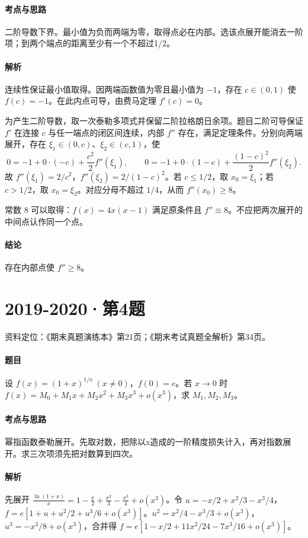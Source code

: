 \documentclass[UTF8,fontset=fandol,12pt,oneside,openany]{ctexrep}
\theoremstyle{definition}
\begin{document}
\paragraph{考点与思路}
二阶导数下界。最小值为负而两端为零，取得点必在内部。选该点展开能消去一阶项；到两个端点的距离至少有一个不超过1/2。
\paragraph{解析}
连续性保证最小值取得。因两端函数值为零且最小值为 $-1$，存在 $c\in(0,1)$ 使 $f(c)=-1$。在此内点可导，由费马定理 $f'(c)=0$。

为产生二阶导数，取一次泰勒多项式并保留二阶拉格朗日余项。题目二阶可导保证 $f'$ 在连接 $c$ 与任一端点的闭区间连续，内部 $f''$ 存在，满足定理条件。分别向两端展开，存在 $\xi_1\in(0,c)$、$\xi_2\in(c,1)$，使
\[
0=-1+0\cdot(-c)+\frac{c^2}{2}f''(\xi_1),\qquad
0=-1+0\cdot(1-c)+\frac{(1-c)^2}{2}f''(\xi_2).
\]
故 $f''(\xi_1)=2/c^2$，$f''(\xi_2)=2/(1-c)^2$。若 $c\le1/2$，取 $x_0=\xi_1$；若 $c>1/2$，取 $x_0=\xi_2$。对应分母不超过 $1/4$，从而 $f''(x_0)\ge8$。

常数 $8$ 可以取得：$f(x)=4x(x-1)$ 满足原条件且 $f''\equiv8$。不应把两次展开的中间点认作同一个点。
\paragraph{结论}
存在内部点使 $f''\ge8$。

\par\addvspace{18pt}\noindent\begin{minipage}{\linewidth}
\section{2019-2020·第4题}
\label{exam:08:q13}
资料定位：《期末真题演练本》第21页；《期末考试真题全解析》第34页。
\paragraph{题目}
设 $f(x)=(1+x)^{1/x}\ (x\ne0)$，$f(0)=e$。若 $x\to0$ 时 $f(x)=M_0+M_1x+M_2x^2+M_3x^3+o(x^3)$，求 $M_1,M_2,M_3$。
\end{minipage}\par
\paragraph{考点与思路}
幂指函数泰勒展开。先取对数，把除以x造成的一阶精度损失计入，再对指数展开。求三次项须先把对数算到四次。
\paragraph{解析}
先展开 $\frac{\ln(1+x)}x=1-\frac x2+\frac{x^2}3-\frac{x^3}4+o(x^3)$。令 $u=-x/2+x^2/3-x^3/4$，$f=e[1+u+u^2/2+u^3/6+o(x^3)]$。$u^2=x^2/4-x^3/3+o(x^3)$，$u^3=-x^3/8+o(x^3)$，合并得 $f=e[1-x/2+11x^2/24-7x^3/16+o(x^3)]$。
\end{document}
